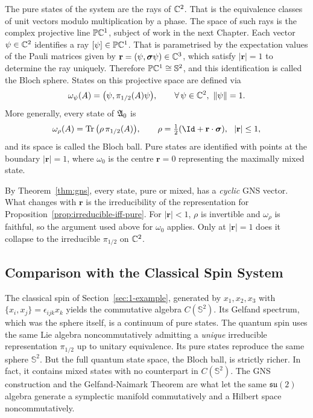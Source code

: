 	The pure states of the system are the rays of $\mathbb{C}^2$. That is the equivalence classes of unit vectors modulo multiplication by a phase. The space of such rays is the complex projective line $\mathbb{P} \mathbb{C}^1$, subject of work in the next Chapter. Each vector $\psi \in \mathbb{C}^2$ identifies a ray $[\psi] \in \mathbb{P} \mathbb{C}^1$. That is parametrised by the expectation values of the Pauli matrices given by $\mathbf{r}=(\psi,\boldsymbol{\sigma}\psi) \in \mathbb{C}^3$, which satisfy $|\mathbf{r}|=1$ to determine the ray uniquely. Therefore $\mathbb{P}\mathbb{C}^1\cong\mathbb S^2$, and this identification is called the Bloch sphere. States on this projective space are defined via
	\begin{equation}
		\omega_\psi(A) = \big(\psi,\pi_{1/2}(A)\psi\big), \qquad \forall\,\psi\in\C^2,\ \|\psi\|=1.
		\label{eq:pure-state-spin}
	\end{equation}
	More generally, every state of $\mathfrak{A}_0$ is
	\begin{equation}
		\omega_\rho(A) = \Tr\big(\rho\,\pi_{1/2}(A)\big), \qquad \rho = \tfrac12(\Id+\mathbf r\cdot\boldsymbol\sigma),\ \ |\mathbf r|\le 1,
		\label{eq:mixed-state-spin}
	\end{equation}
	and its space is called the Bloch ball. Pure states are identified with points at the boundary $|\mathbf r|=1$, where $\omega_0$ is the centre $\mathbf r=0$ representing the maximally mixed state.
	
	By Theorem~\ref{thm:gns}, every state, pure or mixed, has a \emph{cyclic} GNS vector. What changes with $\mathbf r$ is the irreducibility of the representation for Proposition~\ref{prop:irreducible-iff-pure}. For $|\mathbf r|<1$, $\rho$ is invertible and $\omega_\rho$ is faithful, so the argument used above for $\omega_0$ applies. Only at $|\mathbf r|=1$ does it collapse to the irreducible $\pi_{1/2}$ on $\mathbb{C}^2$.
	
	\subsection*{Comparison with the Classical Spin System}
	
	The classical spin of Section~\ref{sec:1-example}, generated by $x_1,x_2,x_3$ with $\{x_i,x_j\}=\epsilon_{ijk}x_k$ yields the commutative algebra $C(\mathbb S^2)$.  Its Gelfand spectrum, which was the sphere itself, is a continuum of pure states. The quantum spin uses the same Lie algebra noncommutatively admitting a \emph{unique} irreducible representation $\pi_{1/2}$ up to unitary equivalence. Its pure states reproduce the same sphere $\mathbb S^2$. But the full quantum state space, the Bloch ball, is strictly richer. In fact, it contains mixed states with no counterpart in $C(\mathbb S^2)$. The GNS construction and the Gelfand-Naimark Theorem are what let the same $\mathfrak{su}(2)$ algebra generate a symplectic manifold commutatively and a Hilbert space noncommutatively.
	
